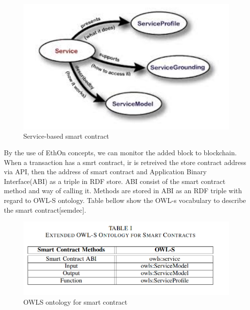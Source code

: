  
  \begin{center}
 	\begin{figure}[htb!]
 		
 		\begin{minipage}{0.55\linewidth}
 			\centering
 			\includegraphics[width=1.55\textwidth]{images/chap02_SmartContract.png}
 		\end{minipage}
 		\caption[Service-based smart contract]{Service-based smart contract}
 		
 	\end{figure}
 	
 \end{center}
By the use of EthOn concepts, we can monitor the added block to blockchain. When a transaction has a smrt contract, ir is retreived the store contract address via API, then the address of smart contract and Application Binary Interface(ABI) as a triple in RDF store. ABI consist of the smart contract method and way of calling it. Methods are stored in ABI as an RDF triple with regard to OWL-S ontology. Table bellow show the OWL-s vocabulary to describe the smart contract[semdec].
\begin{center}
	\begin{figure}[htb!]
		
		\begin{minipage}{0.55\linewidth}
			\centering
			\includegraphics[width=1.95\textwidth]{images/chap02_OWL.png}
		\end{minipage}
		\caption[OWLS ]{OWLS ontology for smart contract} 
		
	\end{figure}
	
\end{center}
